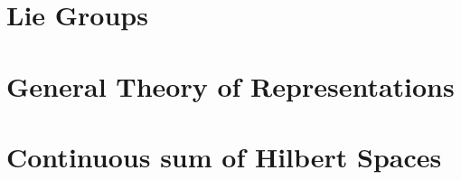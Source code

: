 \documentclass[a4paper,11pt]{book}
\begin{document}
\frontmatter




\tableofcontents

\mainmatter

\part{Lie Groups}\label{partI}








\part{General Theory of Representations}\label{partII}

\setcounter{page}{46}






\part{Continuous sum of Hilbert Spaces}\label{partIII}





\end{document}
